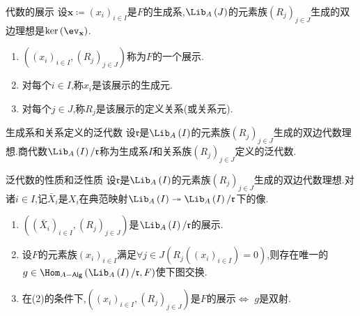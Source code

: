 \begin{definition}{代数的展示}{}
	设$\mathbf{x}\coloneq\left(x_{i}\right)_{i\in I}$是$F$的生成系,$\Lib_{A}\left(J\right)$的元素族$\left(R_{j}\right)_{j\in J}$生成的双边理想是$\ker\left(\ev_{\mathbf{x}}\right)$.
	\begin{enumerate}
		\item $\left(\left(x_{i}\right)_{i\in I},\left(R_{j}\right)_{j\in J}\right)$称为$F$的一个展示.
		\item 对每个$i\in I$,称$x_{i}$是该展示的生成元.
		\item 对每个$j\in J$,称$R_{j}$是该展示的定义关系(或关系元).
	\end{enumerate}
\end{definition}

\begin{definition}{生成系和关系定义的泛代数}{}
	设$\mathfrak{r}$是$\Lib_{A}\left(I\right)$的元素族$\left(R_{j}\right)_{j\in J}$生成的双边代数理想.商代数$\Lib_{A}\left(I\right)/\mathfrak{r}$称为生成系$I$和关系族$\left(R_{j}\right)_{j\in J}$定义的泛代数.
\end{definition}

\begin{proposition}{泛代数的性质和泛性质}{}
	设$\mathfrak{r}$是$\Lib_{A}\left(I\right)$的元素族$\left(R_{j}\right)_{j\in J}$生成的双边代数理想.对诸$i\in I$,记$\bar{X}_{i}$是$X_{i}$在典范映射$\Lib_{A}\left(I\right)\twoheadrightarrow\Lib_{A}\left(I\right)/\mathfrak{r}$下的像.
	\begin{enumerate}
		\item $\left(\left(\bar{X}_{i}\right)_{i\in I},\left(R_{j}\right)_{j\in J}\right)$是$\Lib_{A}\left(I\right)/\mathfrak{r}$的展示.
		\item 设$F$的元素族$\left(x_{i}\right)_{i\in I}$满足$\forall j\in J\left(R_{j}\left(\left(x_{i}\right)_{i\in I}\right)=0\right)$,则存在唯一的$g\in\Hom_{A-\mathsf{Alg}}\left(\Lib_{A}\left(I\right)/\mathfrak{r},F\right)$使下图交换.
		\begin{center}
		\end{center}
		\item 在(2)的条件下,$\left(\left(x_{i}\right)_{i\in I},\left(R_{j}\right)_{j\in J}\right)$是$F$的展示$\iff$ $g$是双射.
	\end{enumerate}
\end{proposition}

